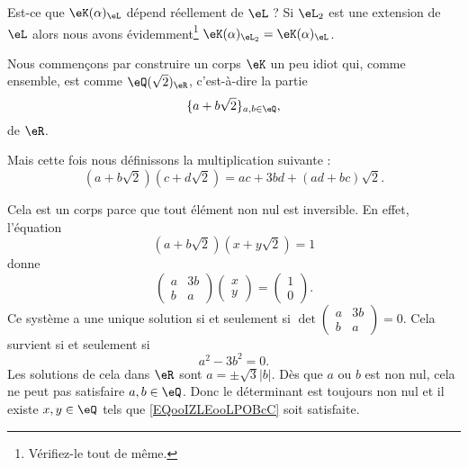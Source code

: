 \begin{example}      \label{EXooJRSUooYhAZkR}
    Est-ce que \( \eK(\alpha)_{\eL}\) dépend réellement de \( \eL\) ? Si \( \eL_2\) est une extension de \( \eL\) alors nous avons évidemment\footnote{Vérifiez-le tout de même.} \( \eK(\alpha)_{\eL_2}=\eK(\alpha)_{\eL}\).

    Nous commençons par construire un corps \( \eK\) un peu idiot qui, comme ensemble, est comme \( \eQ(\sqrt{ 2 })_{\eR}\), c'est-à-dire la partie
    \begin{equation}
        \{ a+b\sqrt{ 2 } \}_{a,b\in \eQ},
    \end{equation}
    de \( \eR\).

    Mais cette fois nous définissons la multiplication suivante :
    \begin{equation}
        (a+b\sqrt{ 2 })(c+d\sqrt{ 2 })=ac+3bd+(ad+bc)\sqrt{ 2 }.
    \end{equation}
    
    Cela est un corps parce que tout élément non nul est inversible. En effet, l'équation
    \begin{equation}        \label{EQooIZLEooLPOBcC}
        (a+b\sqrt{ 2 })(x+y\sqrt{ 2 })=1
    \end{equation}
    donne 
    \begin{equation}
        \begin{pmatrix}
            a    &   3b    \\ 
            b    &   a    
        \end{pmatrix}\begin{pmatrix}
            x    \\ 
            y    
        \end{pmatrix}=\begin{pmatrix}
            1    \\ 
            0    
        \end{pmatrix}.
    \end{equation}
    Ce système a une unique solution si et seulement si \( \det\begin{pmatrix}
        a    &   3b    \\ 
        b    &   a    
    \end{pmatrix}=0\). Cela survient si et seulement si
    \begin{equation}
        a^2-3b^2=0.
    \end{equation}
    Les solutions de cela dans \( \eR\) sont \( a=\pm\sqrt{ 3 }| b |\). Dès que \( a\) ou \( b\) est non nul, cela ne peut pas satisfaire \( a,b\in \eQ\). Donc le déterminant est toujours non nul et il existe \( x,y\in \eQ\) tels que \eqref{EQooIZLEooLPOBcC} soit satisfaite.


\end{example}
